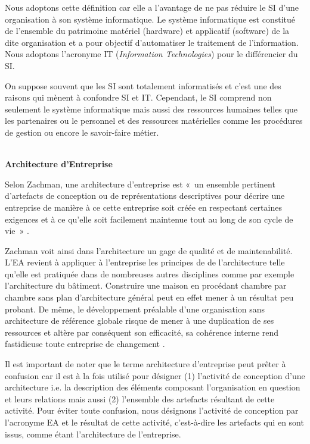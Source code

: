 Nous adoptons cette définition car elle a l'avantage de ne pas réduire le SI 
d'une organisation à son système informatique. Le système informatique est constitué de 
l'ensemble du patrimoine matériel (hardware) et applicatif (software) de la dite 
organisation et a pour objectif d'automatiser le traitement de l'information. 
Nous adoptons l'acronyme IT (\textit{Information Technologies}) pour le 
différencier du SI.

On suppose souvent que les SI sont totalement informatisés et c'est une des 
raisons qui mènent à confondre SI et IT. Cependant, le SI comprend non seulement 
le système informatique mais aussi des ressources humaines telles que les partenaires ou le personnel et des ressources matérielles comme les procédures de gestion ou encore le savoir-faire métier.
\\\

\textbf{Architecture d'Entreprise}

Selon Zachman, une architecture d'entreprise est «~un ensemble pertinent d'artefacts de conception ou de représentations descriptives pour décrire une entreprise de manière à ce cette entreprise soit créée en respectant certaines exigences et à ce qu'elle soit facilement maintenue tout au long de son cycle de vie~» \cite{zachman1997enterprise}. 

Zachman voit ainsi dans l'architecture un gage de qualité et de maintenabilité. L'EA revient à appliquer à l'entreprise les principes de de l'architecture telle qu'elle est pratiquée dans de nombreuses autres disciplines comme par exemple l'architecture du bâtiment. Construire une maison en procédant chambre par chambre sans plan d'architecture général peut en effet mener à un résultat peu probant. De même, le développement préalable  d'une organisation sans 
architecture de référence globale risque de mener à une duplication de ses ressources et altère par conséquent son efficacité, sa cohérence interne rend fastidieuse toute entreprise de changement \cite{zachman1997enterprise} \cite{bernard2012introduction}. 

Il est important de noter que le terme architecture d'entreprise peut prêter à 
confusion car il est à la fois utilisé pour désigner (1) l'activité de 
conception d'une architecture i.e. la description des éléments composant 
l'organisation en question et leurs relations mais aussi (2) l'ensemble des 
artefacts résultant de cette activité. Pour éviter toute confusion, nous désignons l'activité de conception par l'acronyme EA et le résultat de cette activité, c'est-à-dire les artefacts qui en sont issus, comme étant l'architecture de l'entreprise.

